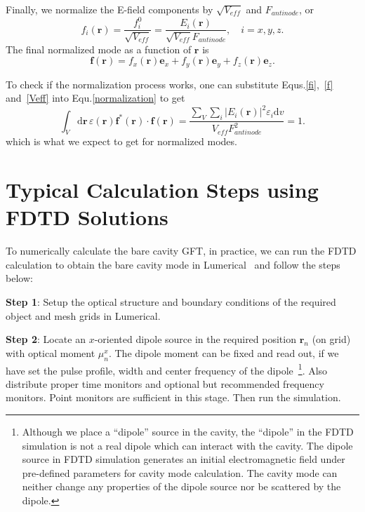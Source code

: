 Finally, we normalize the E-field components by $\sqrt{V_{e\!f\!f}}$ and $F_{antinode}$, or
\begin{equation}
 f_i(\mathbf{r})=\frac{f_i^0}{\sqrt{V_{e\!f\!\! f}}}=\frac{E_i(\mathbf{r})}{\sqrt{V_{e\!f\!\!f}}F_{antinode}}, \quad i=x,y,z.
\label{fi}
\end{equation}
The final normalized mode as a function of $\mathbf{r}$ is
\begin{equation}
 \mathbf{f}(\mathbf{r})=f_x(\mathbf{r})\mathbf{e}_x+f_y(\mathbf{r})\mathbf{e}_y+f_z(\mathbf{r})\mathbf{e}_z.
\label{f}
\end{equation}

To check if the normalization process works, one can substitute Equs.\eqref{fi},~\eqref{f} and~\eqref{Veff} into Equ.\eqref{normalization} to get
\begin{equation}
 \int_V \! \mathrm{d}\mathbf{r} \, \varepsilon(\mathbf{r})\mathbf{f}^*(\mathbf{r}) \cdot \mathbf{f}(\mathbf{r})
= \frac{\sum_V{\sum_i{|E_i(\mathbf{r})|^2\varepsilon_i}}\mathrm{d}v}{V_{ef\!f}F_{antinode}^2}=1.
\end{equation}
which is what we expect to get for normalized modes.

\section{Typical Calculation Steps using FDTD Solutions}
To numerically calculate the bare cavity GFT, in practice, we can run the FDTD calculation to obtain the bare cavity mode in Lumerical~\cite{LumericalSolutions} and follow the steps below:

\textbf{Step 1}: Setup the optical structure and boundary conditions of the required object and mesh grids in Lumerical.

\textbf{Step 2}: Locate an $x$-oriented dipole source in the required position $\mathbf{r}_n$ (on grid) with optical moment $\mu_n^x$.
The dipole moment can be fixed and read out, if we have set the pulse profile, width and center frequency of the dipole~\footnote{Although we place a ``dipole'' source in the cavity, the ``dipole'' in the FDTD simulation is not a real dipole which can interact with the cavity. The dipole source in FDTD simulation generates an initial electromagnetic field under pre-defined parameters for cavity mode calculation. The cavity mode can neither change any properties of the dipole source nor be scattered by the dipole.}. Also distribute proper time monitors and optional but recommended frequency monitors. Point monitors are sufficient in this stage. Then run the simulation.

